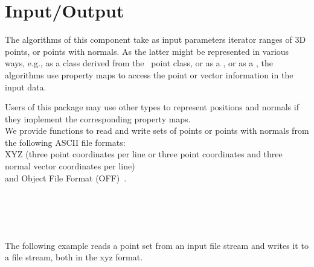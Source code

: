 \section{Input/Output}

The algorithms of this component take as input parameters iterator ranges of 3D points, or points with normals.
As the latter might be represented in various ways, e.g., as a class derived from the \cgal\ point class, or as a
, or as a , the
algorithms use property maps to access the point or vector information in the input data.

Users of this package may use other types to represent positions and normals if they implement the corresponding property maps. \\

We provide functions to read and write sets of points or points with normals from the following ASCII file formats: \\
XYZ (three point coordinates  per line or three point coordinates and three normal vector coordinates  per line) \\
and Object File Format (OFF)~\cite{cgal:p-gmgv16-96}.
\\
  \\
  \\
  \\
  \\

\ccExample

The following example reads a point set from an input file stream and writes it to a file stream, both in the xyz format.
